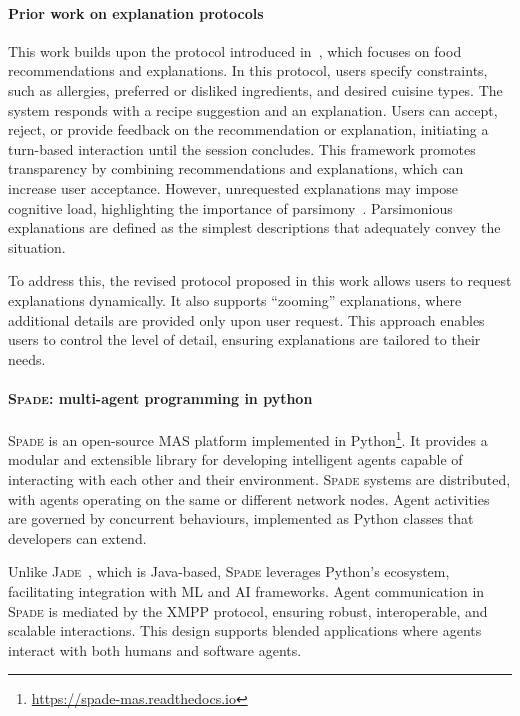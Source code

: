 \paragraph{Prior work on explanation protocols}
%
This work builds upon the protocol introduced in~\cite{buzcu-prima-2022}, which focuses on food recommendations and explanations.
%
In this protocol, users specify constraints, such as allergies, preferred or disliked ingredients, and desired cuisine types.
%
The system responds with a recipe suggestion and an explanation.
%
Users can accept, reject, or provide feedback on the recommendation or explanation, initiating a turn-based interaction until the session concludes.
%
This framework promotes transparency by combining recommendations and explanations, which can increase user acceptance.
%
However, unrequested explanations may impose cognitive load, highlighting the importance of parsimony~\cite{MuallaTKNCAGN22}.
%
Parsimonious explanations are defined as the simplest descriptions that adequately convey the situation.

To address this, the revised protocol proposed in this work allows users to request explanations dynamically.
%
It also supports ``zooming'' explanations, where additional details are provided only upon user request.
%
This approach enables users to control the level of detail, ensuring explanations are tailored to their needs.


\paragraph{\textsc{Spade}: multi-agent programming in python}
%
\textsc{Spade} is an open-source \gls{MAS} platform implemented in Python\footnote{\url{https://spade-mas.readthedocs.io}}.
%
It provides a modular and extensible library for developing intelligent agents capable of interacting with each other and their environment.
%
\textsc{Spade} systems are distributed, with agents operating on the same or different network nodes.
%
Agent activities are governed by concurrent behaviours, implemented as Python classes that developers can extend.

Unlike \textsc{Jade}~\cite{jadebook-2007}, which is Java-based, \textsc{Spade} leverages Python's ecosystem, facilitating integration with \gls{ML} and \gls{AI} frameworks.
%
Agent communication in \textsc{Spade} is mediated by the \gls{XMPP} protocol, ensuring robust, interoperable, and scalable interactions.
%
This design supports blended applications where agents interact with both humans and software agents.

